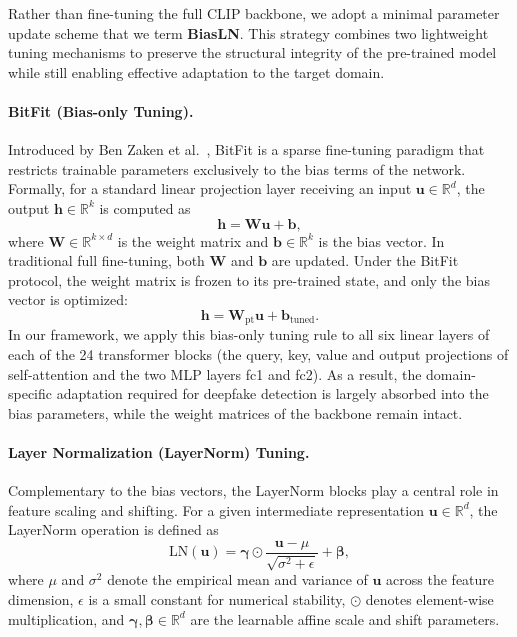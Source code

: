 \documentclass[fonts]{icst}
\newif\ifrevmark\revmarktrue
\newcommand{\rev}[1]{\ifrevmark{\color{revblue}#1}\else#1\fi}
\begin{document}
Rather than fine-tuning the full CLIP backbone, we adopt a minimal parameter update scheme that we term \textbf{BiasLN}.
This strategy combines two lightweight tuning mechanisms to preserve the structural integrity of the pre-trained model while still enabling effective adaptation to the target domain.

\paragraph{BitFit (Bias-only Tuning).}
Introduced by Ben Zaken et al.~\cite{benzaken2022bitfit}, BitFit is a sparse fine-tuning paradigm that restricts trainable parameters exclusively to the bias terms of the network.
Formally, for a standard linear projection layer receiving an input $\mathbf{u} \in \mathbb{R}^{d}$, the output $\mathbf{h} \in \mathbb{R}^{k}$ is computed as
\begin{equation}
    \mathbf{h} = \mathbf{W}\mathbf{u} + \mathbf{b},
\end{equation}
where $\mathbf{W} \in \mathbb{R}^{k \times d}$ is the weight matrix and $\mathbf{b} \in \mathbb{R}^{k}$ is the bias vector.
In traditional full fine-tuning, both $\mathbf{W}$ and $\mathbf{b}$ are updated.
Under the BitFit protocol, the weight matrix is frozen to its pre-trained state, and only the bias vector is optimized:
\begin{equation}
    \mathbf{h} = \mathbf{W}_{\text{pt}}\mathbf{u} + \mathbf{b}_{\text{tuned}}.
\end{equation}
In our framework, we apply this bias-only tuning rule \rev{to all six linear layers of each of the 24 transformer blocks (the query, key, value and output projections of self-attention and the two MLP layers fc1 and fc2)}.
As a result, the domain-specific adaptation required for deepfake detection is largely absorbed into the bias parameters, while the \rev{weight matrices} of the backbone remain intact.

\paragraph{Layer Normalization (LayerNorm) Tuning.}
Complementary to the bias vectors, the LayerNorm blocks play a central role in feature scaling and shifting.
For a given intermediate representation $\mathbf{u} \in \mathbb{R}^{d}$, the LayerNorm operation is defined as
\begin{equation}
    \mathrm{LN}(\mathbf{u}) = \boldsymbol{\gamma} \odot \frac{\mathbf{u} - \mu}{\sqrt{\sigma^2 + \epsilon}} + \boldsymbol{\beta},
\end{equation}
where $\mu$ and $\sigma^2$ denote the empirical mean and variance of $\mathbf{u}$ across the feature dimension, $\epsilon$ is a small constant for numerical stability, $\odot$ denotes element-wise multiplication, and $\boldsymbol{\gamma}, \boldsymbol{\beta} \in \mathbb{R}^{d}$ are the learnable affine scale and shift parameters.
\end{document}
